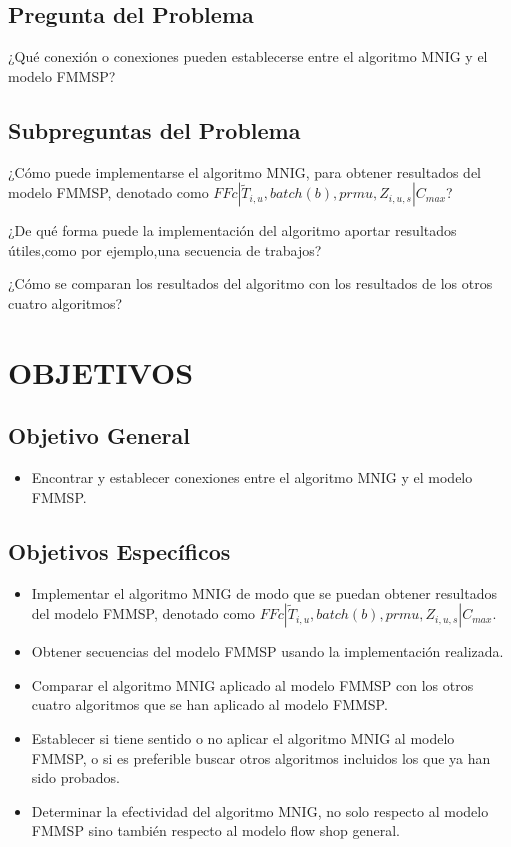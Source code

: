 \documentclass{article}
\def\notac_modelo{$FFc | \tilde{T}_{i, u}, batch(b), prmu, Z_{i, u, s} | C_{max}$}
\begin{document}
\subsection{Pregunta del Problema}

¿Qué conexión o conexiones pueden establecerse entre el algoritmo MNIG y el modelo FMMSP?

\subsection{Subpreguntas del Problema}

\indent\indent
¿Cómo puede implementarse el algoritmo MNIG, para obtener resultados del modelo FMMSP, denotado como \notac_modelo?

¿De qué forma puede la implementación del algoritmo aportar resultados útiles,como por ejemplo,una secuencia de trabajos?

¿Cómo se comparan los resultados del algoritmo con los resultados de los otros cuatro algoritmos?

\section{OBJETIVOS}

\subsection{Objetivo General}

\begin{itemize}
    \item Encontrar y establecer conexiones entre el algoritmo MNIG y el modelo FMMSP.
\end{itemize}

\subsection{Objetivos Específicos}

\begin{itemize}
    \item Implementar el algoritmo MNIG de modo que se puedan obtener resultados del modelo FMMSP, denotado como \linebreak \notac_modelo.
    \item Obtener secuencias del modelo FMMSP usando la implementación realizada.
    \item Comparar el algoritmo MNIG aplicado al modelo FMMSP con los otros cuatro algoritmos que se han aplicado al modelo FMMSP.
    \item Establecer si tiene sentido o no aplicar el algoritmo MNIG al modelo FMMSP, o si es preferible buscar otros algoritmos incluidos los que ya han sido probados.
    \item Determinar la efectividad del algoritmo MNIG, no solo respecto al modelo FMMSP sino también respecto al modelo flow shop general.
\end{itemize}
\end{document}
